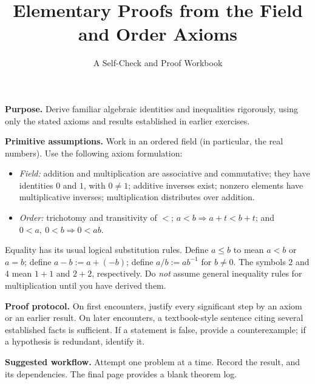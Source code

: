 \documentclass{workbook}
\title{Elementary Proofs from the Field and Order Axioms}
\subtitle{A Self-Check and Proof Workbook}
\author{}
\date{}
\begin{document}
\maketitle

\textbf{Purpose.} Derive familiar algebraic identities and inequalities rigorously, using
only the stated axioms and results established in earlier exercises.

\textbf{Primitive assumptions.} Work in an ordered field (in particular, the real
numbers). Use the following axiom formulation:
\begin{itemize}[leftmargin=*,nosep]
  \item \emph{Field:} addition and multiplication are associative and commutative;
  they have identities $0$ and $1$, with $0\ne1$; additive inverses exist;
  nonzero elements have multiplicative inverses; multiplication distributes over addition.
  \item \emph{Order:} trichotomy and transitivity of $<$;
  $a<b\Rightarrow a+t<b+t$;
  and $0<a,\ 0<b\Rightarrow0<ab$.
\end{itemize}
Equality has its usual logical substitution rules. Define
$a\le b$ to mean $a<b$ or $a=b$; define $a-b:=a+(-b)$; define
$a/b:=ab^{-1}$ for $b\ne0$. The symbols $2$ and $4$ mean $1+1$ and
$2+2$, respectively. Do \emph{not} assume general inequality rules for
multiplication until you have derived them.

\textbf{Proof protocol.} On first encounters, justify every significant step by
an axiom or an earlier result. On later encounters, a textbook-style sentence
citing several established facts is sufficient. If a statement is false,
provide a counterexample; if a hypothesis is redundant, identify it.

\textbf{Suggested workflow.} Attempt one problem at a time. Record the result,
and its dependencies. The final page provides a blank theorem log.
\end{document}
